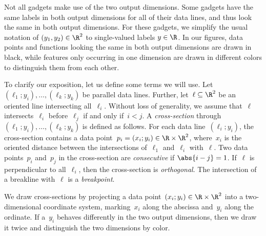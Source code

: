 Not all gadgets make use of the two output dimensions.
Some gadgets have the same labels in both output dimensions for all of their data lines, and thus look the same in both output dimensions.
For these gadgets, we simplify the usual notation of $(y_1,y_2) \in \R^2$ to single-valued labels $y \in \R$.
In our figures, data points and functions looking the same in both output dimensions are drawn in black, while features only occurring in one dimension are drawn in different colors to distinguish them from each other.

To clarify our exposition, let us define some terms we will use.
Let $(\ell_1; y_i), \ldots, (\ell_k; y_k)$ be parallel data lines.
Further, let~$\ell \subseteq \R^2$ be an oriented line intersecting all~$\ell_i$.
Without loss of generality, we assume that~$\ell$ intersects~$\ell_i$ before~$\ell_j$ if and only if~$i < j$.
A \emph{cross-section} through $(\ell_1; y_i), \ldots, (\ell_k; y_k)$ is defined as 
follows. %
For each data line~$(\ell_i; y_i)$, the cross-section contains a data point~$p_i = (x_i; y_i) \in \R \times \R^2$, where~$x_i$ is the oriented distance between the intersections of~$\ell_1$ and~$\ell_i$ with~$\ell$.
Two data points~$p_i$ and~$p_j$ in the cross-section are \emph{consecutive} if $\abs{i - j} = 1$.
If~$\ell$ is perpendicular to all~$\ell_i$, then the cross-section is \emph{orthogonal}.
The intersection of a breakline with~$\ell$ is a \emph{breakpoint}.

We draw cross-sections by projecting a data point~$(x_i; y_i) \in \R \times \R^2$ into a two-dimensional coordinate system, marking~$x_i$ along the abscissa and~$y_i$ along the ordinate.
If a~$y_i$ behaves differently in the two output dimensions, then we draw it twice and distinguish the two dimensions by color.



